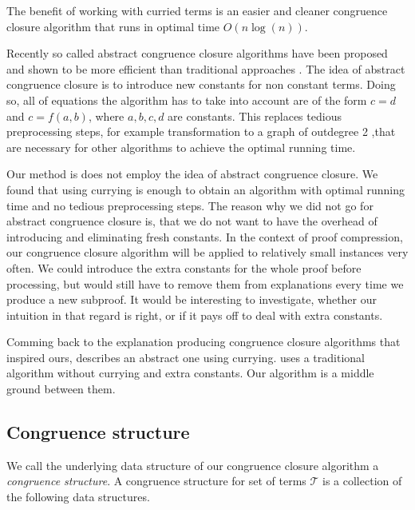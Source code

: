 The benefit of working with curried terms is an easier and cleaner congruence closure algorithm that runs in optimal time $O(n \log(n))$.

Recently so called abstract congruence closure algorithms have been proposed and shown to be more efficient than traditional approaches \cite{Bachmair2000}.
The idea of abstract congruence closure is to introduce new constants for non constant terms.
Doing so, all of equations the algorithm has to take into account are of the form $c = d$ and $c = f(a,b)$, where $a,b,c,d$ are constants.
This replaces tedious preprocessing steps, for example transformation to a graph of outdegree 2 \cite{Downey1980},that are necessary for other algorithms to achieve the optimal running time.

Our method is does not employ the idea of abstract congruence closure.
We found that using currying is enough to obtain an algorithm with optimal running time and no tedious preprocessing steps.
The reason why we did not go for abstract congruence closure is, that we do not want to have the overhead of introducing and eliminating fresh constants.
In the context of proof compression, our congruence closure algorithm will be applied to relatively small instances very often.
We could introduce the extra constants for the whole proof before processing, but would still have to remove them from explanations every time we produce a new subproof.
It would be interesting to investigate, whether our intuition in that regard is right, or if it pays off to deal with extra constants.

Comming back to the explanation producing congruence closure algorithms that inspired ours, \cite{Nieuwenhuis2005,Nieuwenhuis2007} describes an abstract one using currying.
\cite{Fontaine2004} uses a traditional algorithm without currying and extra constants.
Our algorithm is a middle ground between them.

\subsection*{Congruence structure}

We call the underlying data structure of our congruence closure algorithm a \emph{congruence structure}.
A congruence structure for set of terms $\mathcal{T}$ is a collection of the following data structures.

